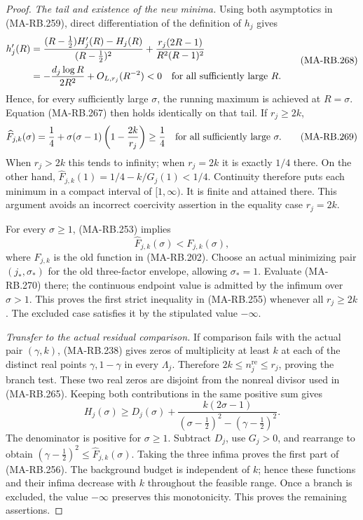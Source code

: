 \begin{proof}
\emph{The tail and existence of the new minima.}
Using both asymptotics in (MA-RB.259), direct differentiation
of the definition of \(h_j\) gives
\[
 \begin{aligned}
 h_j'(R)
  &=\frac{(R-\tfrac12)H_j'(R)-H_j(R)}{(R-\tfrac12)^2}
       +\frac{r_j(2R-1)}{R^2(R-1)^2}\\
  &=-\frac{d_j\log R}{2R^2}+O_{L,r_j}(R^{-2})<0
                    \quad\hbox{for all sufficiently large }R.
 \end{aligned}
 \tag{MA-RB.268}
\]
Hence, for every sufficiently large \(\sigma\), the running
maximum is achieved at \(R=\sigma\). Equation (MA-RB.267)
then holds identically on that tail. If \(r_j\ge2k\),
\[
 \widehat F_{j,k}(\sigma)
   =\frac14+\sigma(\sigma-1)
                           \left(1-\frac{2k}{r_j}\right)
   \ge\frac14
               \quad\hbox{for all sufficiently large }\sigma.
 \tag{MA-RB.269}
\]
When \(r_j>2k\) this tends to infinity; when \(r_j=2k\)
it is exactly \(1/4\) there. On the other hand,
\(\widehat F_{j,k}(1)=1/4-k/G_j(1)<1/4\).
Continuity therefore puts each minimum in a compact interval
of \([1,\infty)\). It is finite and attained there.
This argument avoids an incorrect coercivity assertion
in the equality case \(r_j=2k\).

For every \(\sigma\ge1\), (MA-RB.253) implies
\[
   \widehat F_{j,k}(\sigma)<F_{j,k}(\sigma),
 \tag{MA-RB.270}
\]
where \(F_{j,k}\) is the old function in (MA-RB.202).
Choose an actual minimizing pair \((j_*,\sigma_*)\)
for the old three-factor envelope, allowing \(\sigma_*=1\).
Evaluate (MA-RB.270) there; the continuous endpoint value
is admitted by the infimum over \(\sigma>1\).
This proves the first strict inequality in (MA-RB.255)
whenever all \(r_j\ge2k\). The excluded case satisfies
it by the stipulated value \(-\infty\).

\emph{Transfer to the actual residual comparison.}
If comparison fails with the actual pair \((\gamma,k)\),
(MA-RB.238) gives zeros of multiplicity at least \(k\)
at each of the distinct real points \(\gamma,1-\gamma\)
in every \(\Lambda_j\). Therefore
\(2k\le n_j^{\mathrm{re}}\le r_j\), proving the branch
test. These two real zeros are disjoint from the nonreal
divisor used in (MA-RB.265). Keeping both contributions
in the same positive sum gives
\[
 H_j(\sigma)\ge D_j(\sigma)
       +\frac{k(2\sigma-1)}
          {(\sigma-\tfrac12)^2-(\gamma-\tfrac12)^2}.
 \tag{MA-RB.271}
\]
The denominator is positive for \(\sigma\ge1\).
Subtract \(D_j\), use \(G_j>0\), and rearrange to obtain
\((\gamma-\tfrac12)^2\le\widehat F_{j,k}(\sigma)\).
Taking the three infima proves the first part of (MA-RB.256).
The background budget is independent of \(k\); hence these
functions and their infima decrease with \(k\) throughout
the feasible range. Once a branch is excluded, the value
\(-\infty\) preserves this monotonicity. This proves the
remaining assertions.
\end{proof}

